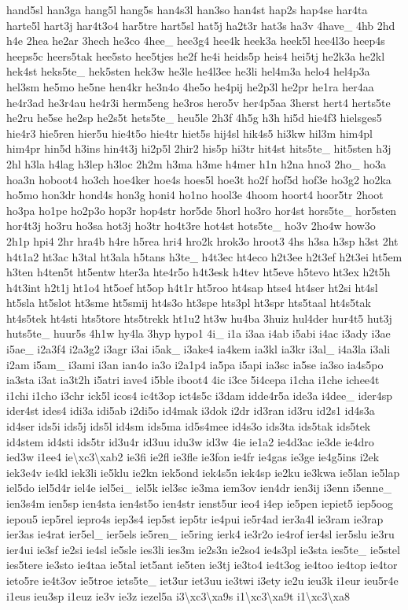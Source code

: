 {hand5sl han3ga hang5l hang5s han4s3l han3so han4st hap2s hap4se har4ta harte5l hart3j har4t3o4 har5tre hart5sl hat5j ha2t3r hat3s ha3v 4have\-\_\- 4hb 2hd h4e 2hea he2ar 3hech he3co 4hee\-\_\- hee3g4 hee4k heek3a heek5l hee4l3o heep4s heeps5c heers5tak hee5sto hee5tjes he2f he4i heids5p heis4 hei5tj he2k3a he2kl hek4st heks5te\-\_\- hek5sten hek3w he3le he4l3ee he3li hel4m3a helo4 hel4p3a hel3sm he5mo he5ne hen4kr he3n4o 4he5o he4pij he2p3l he2pr he1ra her4aa he4r3ad he3r4au he4r3i herm5eng he3ros hero5v her4p5aa 3herst hert4 herts5te he2ru he5se he2sp he2s5t hets5te\-\_\- heu5le 2h3f 4h5g h3h hi5d hie4f3 hielsges5 hie4r3 hie5ren hier5u hie4t5o hie4tr hiet5s hij4sl hik4s5 hi3kw hil3m him4pl him4pr hin5d h3ins hin4t3j hi2p5l 2hir2 his5p hi3tr hit4st hits5te\-\_\- hit5sten h3j 2hl h3la h4lag h3lep h3loc 2h2m h3ma h3me h4mer h1n h2na hno3 2ho\-\_\- ho3a hoa3n hoboot4 ho3ch hoe4ker hoe4s hoes5l hoe3t ho2f hof5d hof3e ho3g2 ho2ka ho5mo hon3dr hond4s hon3g honi4 ho1no hool3e 4hoom hoort4 hoor5tr 2hoot ho3pa ho1pe ho2p3o hop3r hop4str hor5de 5horl ho3ro hor4st hors5te\-\_\- hor5sten hor4t3j ho3ru ho3sa hot3j ho3tr ho4t3re hot4st hots5te\-\_\- ho3v 2ho4w how3o 2h1p hpi4 2hr hra4b h4re h5rea hri4 hro2k hrok3o hroot3 4hs h3sa h3sp h3st 2ht h4t1a2 ht3ac h3tal ht3ala h5tans h3te\-\_\- h4t3ec ht4eco h2t3ee h2t3ef h2t3ei ht5em h3ten h4ten5t ht5entw hter3a hte4r5o h4t3esk h4tev ht5eve h5tevo ht3ex h2t5h h4t3int h2t1j ht1o4 ht5oef ht5op h4t1r ht5roo ht4sap htse4 ht4ser ht2si ht4sl ht5sla ht5slot ht3sme ht5smij ht4s3o ht3spe hts3pl ht3spr hts5taal ht4s5tak ht4s5tek ht4sti hts5tore hts5trekk ht1u2 ht3w hu4ba 3huiz hul4der hur4t5 hut3j huts5te\-\_\- huur5s 4h1w hy4la 3hyp hypo1 4i\-\_\- i1a i3aa i4ab i5abi i4ac i3ady i3ae i5ae\-\_\- i2a3f4 i2a3g2 i3agr i3ai i5ak\-\_\- i3ake4 ia4kem ia3kl ia3kr i3al\-\_\- i4a3la i3ali i2am i5am\-\_\- i3ami i3an ian4o ia3o i2a1p4 ia5pa i5api ia3sc ia5se ia3so ia4s5po ia3sta i3at ia3t2h i5atri iave4 i5ble iboot4 4ic i3ce 5i4cepa i1cha i1che ichee4t i1chi i1cho i3chr ick5l icos4 ic4t3op ict4s5c i3dam idde4r5a ide3a i4dee\-\_\- ider4sp ider4st ides4 idi3a idi5ab i2di5o id4mak i3dok i2dr id3ran id3ru id2s1 id4s3a id4ser ids5i ids5j ids5l id4sm ids5ma id5s4mee id4s3o ids3ta ids5tak ids5tek id4stem id4sti ids5tr id3u4r id3uu idu3w id3w 4ie ie1a2 ie4d3ac ie3de ie4dro ied3w i1ee4 ie\textbackslash{}xc3\textbackslash{}xab2 ie3fi ie2fl ie3fle ie3fon ie4fr ie4gas ie3ge ie4g5ins i2ek iek3e4v ie4kl iek3li ie5klu ie2kn iek5ond iek4s5n iek4sp ie2ku ie3kwa ie5lan ie5lap iel5do iel5d4r iel4e iel5ei\-\_\- iel5k iel3sc ie3ma iem3ov ien4dr ien3ij i3enn i5enne\-\_\- ien3s4m ien5sp ien4sta ien4st5o ien4str ienst5ur ieo4 i4ep ie5pen iepiet5 iep5oog iepou5 iep5rel iepro4s iep3s4 iep5st iep5tr ie4pui ie5r4ad ier3a4l ie3ram ie3rap ier3as ie4rat ier5el\-\_\- ier5els ie5ren\-\_\- ie5ring ierk4 ie3r2o ie4rof ier4sl ier5slu ie3ru ier4ui ie3sf ie2si ie4sl ie5sle ies3li ies3m ie2s3n ie2so4 ie4s3pl ie3sta ies5te\-\_\- ie5stel ies5tere ie3sto ie4taa ie5tal iet5ant ie5ten ie3tj ie3to4 ie4t3og ie4too ie4top ie4tor ieto5re ie4t3ov ie5troe iets5te\-\_\- iet3ur iet3uu ie3twi i3ety ie2u ieu3k i1eur ieu5r4e i1eus ieu3sp i1euz ie3v ie3z iezel5a i3\textbackslash{}xc3\textbackslash{}xa9s i1\textbackslash{}xc3\textbackslash{}xa9t i1\textbackslash{}xc3\textbackslash{}xa8 }
